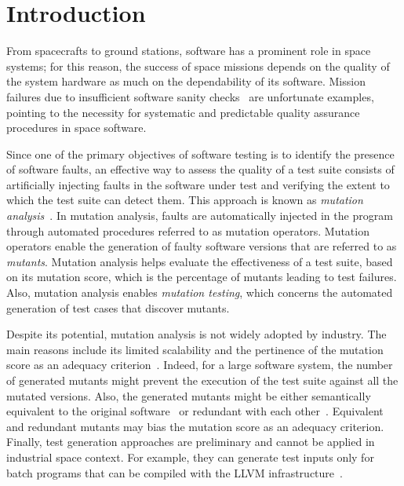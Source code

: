 
\section{Introduction}
\label{sec:introduction}

 
From spacecrafts to ground stations, software has a prominent role in space systems; for this reason, the success of space missions depends on the quality of the system hardware as much on the dependability of its software. Mission failures due to insufficient software sanity checks~\cite{Schiaparelli} are unfortunate examples, pointing to the necessity for systematic and predictable quality assurance procedures in space software. 


Since one of the primary objectives of software testing is to identify the presence of software faults, an effective way to assess the quality of a test suite consists of artificially injecting faults in the software under test and verifying the extent to which the test suite can detect them. 
This approach is known as \emph{mutation analysis}~\cite{DeMillo78}. 
In mutation analysis, faults are automatically injected in the program through automated procedures referred to as mutation operators. Mutation operators enable the generation of faulty software versions that are referred to as \emph{mutants}.  
Mutation analysis helps evaluate the effectiveness of a test suite,  based on its mutation score, which is the percentage of mutants leading to test failures. Also, mutation analysis enables \emph{mutation testing}, which concerns the automated generation of test cases that discover mutants.

Despite its potential, mutation analysis is not widely adopted by industry. The main reasons include its limited scalability and the pertinence of the mutation score as an adequacy criterion~\cite{papadakis2016threats}. Indeed, for a large software system, the number of generated mutants might prevent the execution of the test suite against all the mutated versions. Also, the generated mutants might be either 
semantically equivalent to the original software~\cite{madeyski2013overcoming} or redundant with each other~\cite{Shin:TSE:DCriterion:2018}. Equivalent and redundant mutants may bias the mutation score as an adequacy criterion. 
Finally, test generation approaches are preliminary and cannot be applied in industrial space context. For example, they can generate test inputs only for batch programs that can be compiled with the LLVM infrastructure~\cite{chekam2021killing}.

